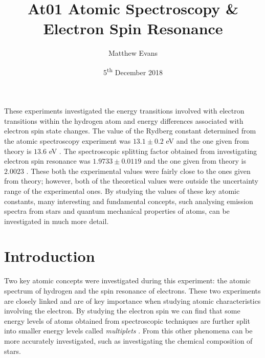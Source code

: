\documentclass{article}
\begin{document}
\title{At01 Atomic Spectroscopy \& Electron Spin Resonance} %
\author{Matthew Evans}%
\date{5\textsuperscript{th} December 2018} %
\maketitle %

\begin{onecolabstract}
\noindent
These experiments investigated the energy transitions involved with electron transitions within the hydrogen atom and energy differences associated with electron spin state changes. The value of the Rydberg constant determined from the atomic spectroscopy experiment was $13.1 \pm 0.2$ eV and the one given from theory is $13.6$ eV \cite{Paper01}. The spectroscopic splitting factor obtained from investigating electron spin resonance was $1.9733 \pm 0.0119$ and the one given from theory is $2.0023$ \cite{Paper02}. These both the experimental values were fairly close to the ones given from theory; however, both of the theoretical values were outside the uncertainty range of the experimental ones. By studying the values of these key atomic constants, many interesting and fundamental concepts, such analysing emission spectra from stars and quantum mechanical properties of atoms, can be investigated in much more detail.

\end{onecolabstract}
\vspace{5mm} %


\section{Introduction}
\label{sec:introduction}

Two key atomic concepts were investigated during this experiment: the atomic spectrum of hydrogen and the spin resonance of electrons. These two experiments are closely linked and are of key importance when studying atomic characteristics involving the electron. By studying the electron spin we can find that some energy levels of atoms obtained from spectroscopic techniques are further split into smaller energy levels called \textit{multiplets} \cite{Book01}. From this other phenomena can be more accurately investigated, such as investigating the chemical composition of stars. 
\end{document}
